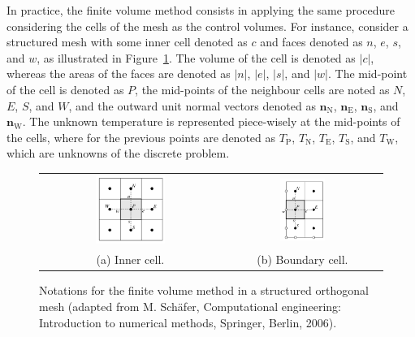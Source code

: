 In practice, the finite volume method consists in applying the same procedure considering the cells of the mesh as the control volumes.
For instance, consider a structured mesh with some inner cell denoted as $c$ and faces denoted as $n$, $e$, $s$, and $w$, as illustrated in Figure~\ref{chap1:fig:computational_methods_finite_volume_method_orthogonal}.
The volume of the cell is denoted as $\left\vert c\right\vert$, whereas the areas of the faces are denoted as $\left\vert n\right\vert$, $\left\vert e\right\vert$, $\left\vert s\right\vert$, and $\left\vert w\right\vert$.
The mid-point of the cell is denoted as $P$, the mid-points of the neighbour cells are noted as $N$, $E$, $S$, and $W$, and the outward unit normal vectors denoted as $\bm{n}_{\textrm{N}}$, $\bm{n}_{\textrm{E}}$, $\bm{n}_{\textrm{S}}$, and $\bm{n}_{\textrm{W}}$.
The unknown temperature is represented piece-wisely at the mid-points of the cells, where for the previous points are denoted as $T_{\textrm{P}}$, $T_{\textrm{N}}$, $T_{\textrm{E}}$, $T_{\textrm{S}}$, and $T_{\textrm{W}}$, which are unknowns of the discrete problem.

\begin{figure}[!htp]
\centering
\begin{tabular}{@{}c@{\hskip 1.5cm}c@{}}
\includegraphics[width=0.4\textwidth]{chap1/include/figures/finite_volume_method_inner.png}
& \includegraphics[width=0.3\textwidth]{chap1/include/figures/finite_volume_method_boundary.png}\\
\small (a) Inner cell. & \small (b) Boundary cell.
\end{tabular}
\caption[Notations for the finite volume method with a structured orthogonal mesh.]{Notations for the finite volume method in a structured orthogonal mesh (adapted from M. Sch\"afer, Computational engineering: Introduction to numerical methods, Springer, Berlin, 2006).}
\label{chap1:fig:computational_methods_finite_volume_method_orthogonal}
\end{figure}

